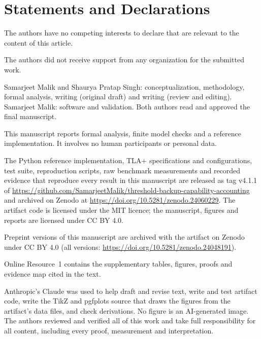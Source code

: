 \documentclass[pdflatex,sn-mathphys-num]{sn-jnl}%
\theoremstyle{plain}
\theoremstyle{definition}
\begin{document}
\backmatter
\section*{Statements and Declarations}

The authors have no competing interests to declare that are relevant to the content of this article.

The authors did not receive support from any organization for the submitted work.

Samarjeet Malik and Shaurya Pratap Singh: conceptualization, methodology, formal analysis, writing (original draft) and writing (review and editing). Samarjeet Malik: software and validation. Both authors read and approved the final manuscript.

This manuscript reports formal analysis, finite model checks and a reference implementation. It involves no human participants or personal data.

The Python reference implementation, TLA+ specifications and configurations, test suite, reproduction scripts, raw benchmark measurements and recorded evidence that reproduce every result in this manuscript are released as tag v4.1.1 of \url{https://github.com/SamarjeetMalik/threshold-backup-capability-accounting} and archived on Zenodo at \url{https://doi.org/10.5281/zenodo.24060229}. The artifact code is licensed under the MIT licence; the manuscript, figures and reports are licensed under CC BY 4.0.

Preprint versions of this manuscript are archived with the artifact on Zenodo under CC BY 4.0 (all versions: \url{https://doi.org/10.5281/zenodo.24048191}).

Online Resource~1 contains the supplementary tables, figures, proofs and evidence map cited in the text.

Anthropic's Claude was used to help draft and revise text, write and test artifact code, write the TikZ and pgfplots source that draws the figures from the artifact's data files, and check derivations. No figure is an AI-generated image. The authors reviewed and verified all of this work and take full responsibility for all content, including every proof, measurement and interpretation.




\end{document}
